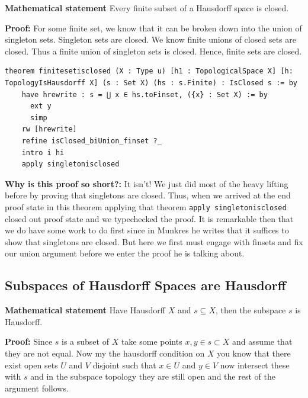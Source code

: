 \documentclass[11pt]{article}
\begin{document}
\textbf{Mathematical statement} 
Every finite subset of a Hausdorff space is closed.


\textbf{Proof:} 
For some finite set, we know that it can be broken down into the union of singleton sets. Singleton sets are closed. We know finite unions of closed sets are closed. Thus a finite union of singleton sets is closed. Hence, finite sets are closed. 

\begin{verbatim}
theorem finitesetisclosed (X : Type u) [h1 : TopologicalSpace X] [h: TopologyIsHausdorff X] (s : Set X) (hs : s.Finite) : IsClosed s := by
    have hrewrite : s = ⋃ x ∈ hs.toFinset, ({x} : Set X) := by
      ext y
      simp
    rw [hrewrite]
    refine isClosed_biUnion_finset ?_
    intro i hi 
    apply singletonisclosed 
\end{verbatim}


\medskip
\noindent
\textbf{Why is this proof so short?:} It isn't! We just did most of the heavy lifting before by proving that singletons are closed. Thus, when we arrived at the end proof state in this theorem applying that theorem \verb|apply singletonisclosed| closed out proof state and we typechecked the proof. It is remarkable then that we do have some work to do first since in Munkres he writes that it suffices to show that singletons are closed. But here we first must engage with finsets and fix our union argument before we enter the proof he is talking about. 

\subsection{Subspaces of Hausdorff Spaces are Hausdorff}

\textbf{Mathematical statement} 
Have Hausdorff $X$  and $s\subseteq X$, then the subspace $s$ is Hausdorff.

\textbf{Proof:} 
Since $s$ is a subset of $X$ take some points $x, y \in s \subset X$ and assume that they are not equal. Now my the hausdorff condition on $X$ you know that there exist open sets $U$ and $V$ disjoint such that $x \in U$ and $y \in V$ now intersect these with $s$ and in the subspace topology they are still open and the rest of the argument follows. 
\end{document}
